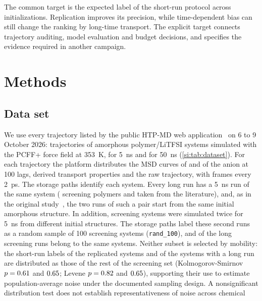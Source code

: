 \documentclass[preprint,12pt]{elsarticle}
\begin{document}
The common target is the expected label of the short-run protocol across initializations.
Replication improves its precision, while time-dependent bias can still change the ranking by
long-time transport. The explicit target connects trajectory auditing, model evaluation and
budget decisions, and specifies the evidence required in another campaign.


\section{Methods}\label{sec:methods}
\subsection{Data set}\label{sec:data}
We use every trajectory listed by the public HTP-MD web application~\cite{Xie2023HTPMD} on
6 to 9 October 2026: \nTotal{} trajectories of amorphous polymer/LiTFSI systems simulated with the PCFF+ force
field at \SI{353}{\kelvin}, \nShort{} for \SI{5}{\nano\second} and \nLong{} for
\SI{50}{\nano\second} (\cref{si:tab:dataset}). For each trajectory the platform distributes the
MSD curves of \Li{} and of the anion at 100 lags, derived transport properties and the raw
trajectory, with frames every \SI{2}{\pico\second}. The storage paths identify each system. Every
long run has a \SI{5}{\nano\second} run of the same system (\nLongScreen{} screening polymers and
\nLongLit{} taken from the literature), and, as in the original study~\cite{Xie2022Accelerating},
the two runs of such a pair start from the same initial amorphous structure. In addition, \nRep{}
screening systems were simulated twice for \SI{5}{\nano\second} from different initial
structures. The storage paths label these second runs as a random sample of 100 screening
systems (\texttt{rand\_100}), and \techoEndReprOverlap{} of the \nLongScreen{} long screening runs
belong to the same systems. Neither subset is selected by mobility: the short-run labels of the
replicated systems and of the systems with a long run are distributed as those of the rest of the
screening set (Kolmogorov-Smirnov $p=0.61$ and $0.65$; Levene
$p=0.82$ and $0.65$), supporting their use to estimate population-average noise under the documented sampling design.
A nonsignificant distribution test does not establish representativeness of noise across chemical
\end{document}
